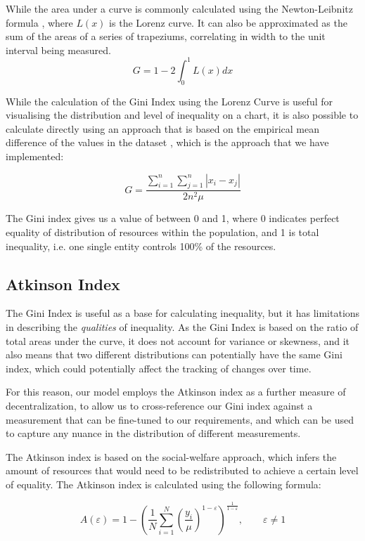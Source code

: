 \documentclass[conference]{IEEEtran}
\begin{document}
While the area under a curve is commonly calculated using the Newton-Leibnitz formula \cite{kalinski2016} , where $L(x)$ is the Lorenz curve.  It can also be approximated as the sum of the areas of a series of trapeziums, correlating in width to the unit interval being measured. 
\[G=1-2\int_{0}^{1}L\left( x \right)dx\]

While the calculation of the Gini Index using the Lorenz Curve is useful for visualising the distribution and level of inequality on a chart, it is also possible to calculate directly using an approach that is based on the empirical mean difference of the values in the dataset \cite{gastwirth1972estimation}, which is the approach that we have implemented:

\[G=\frac{\sum_{i=1}^{n}\sum_{j=1}^{n}\left| x_i - x_j \right|}{2n^2\mu}\]

The Gini index gives us a value of between 0 and 1, where 0 indicates perfect equality of distribution of resources within the population, and 1 is total inequality, i.e. one single entity controls 100\% of the resources.

\subsection{Atkinson Index}

The Gini Index is useful as a base for calculating inequality, but it has limitations in describing the \textit{qualities} of inequality.  As the Gini Index is based on the ratio of total areas under the curve, it does not account for variance or skewness, and it also means that two different distributions can potentially have the same Gini index, which could potentially affect the tracking of changes over time.

For this reason, our model employs the Atkinson index \cite{atkinson1970measurement} as a further measure of decentralization, to allow us to cross-reference our Gini index against a measurement that can be fine-tuned to our requirements, and which can be used to capture any nuance in the distribution of different measurements.

The Atkinson index is based on the social-welfare approach, which infers the amount of resources that would need to be redistributed to achieve a certain level of equality.  The Atkinson index is calculated using the following formula:

\[A(\varepsilon) = 1 - \left(\frac{1}{N} \sum_{i=1}^{N} \left(\frac{y_i}{\mu}\right)^{1 - \varepsilon}\right)^{\frac{1}{1 - \varepsilon}}, \quad \quad \varepsilon \neq 1
\]
\end{document}
